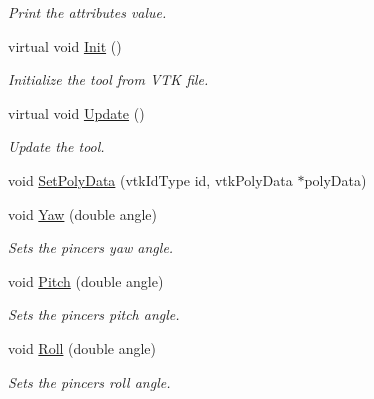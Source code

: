 \begin{DoxyCompactItemize}
\begin{DoxyCompactList}\small\item\em Print the attributes value. \item\end{DoxyCompactList}\item 
virtual void \hyperlink{classvtkToolDummy_aaf4c69a9c0fc3432e678ca9fffc913dc}{Init} ()
\begin{DoxyCompactList}\small\item\em Initialize the tool from VTK file. \item\end{DoxyCompactList}\item 
virtual void \hyperlink{classvtkToolDummy_a19cda726ffda0a3955e519d7b42e4882}{Update} ()
\begin{DoxyCompactList}\small\item\em Update the tool. \item\end{DoxyCompactList}\item 
void \hyperlink{classvtkToolDummy_a3170be76c18a7507cb6014fc49123919}{SetPolyData} (vtkIdType id, vtkPolyData $\ast$polyData)
\item 
\hypertarget{classvtkToolDummy_ae5dce01d7d7cf21ca321d0899531cc1c}{
void \hyperlink{classvtkToolDummy_ae5dce01d7d7cf21ca321d0899531cc1c}{Yaw} (double angle)}
\label{classvtkToolDummy_ae5dce01d7d7cf21ca321d0899531cc1c}

\begin{DoxyCompactList}\small\item\em Sets the pincers yaw angle. \item\end{DoxyCompactList}\item 
\hypertarget{classvtkToolDummy_a5ea0a677fb4cae300394b118197f2c8b}{
void \hyperlink{classvtkToolDummy_a5ea0a677fb4cae300394b118197f2c8b}{Pitch} (double angle)}
\label{classvtkToolDummy_a5ea0a677fb4cae300394b118197f2c8b}

\begin{DoxyCompactList}\small\item\em Sets the pincers pitch angle. \item\end{DoxyCompactList}\item 
\hypertarget{classvtkToolDummy_af3e1893d057ad3db3775c4cffd6a8b18}{
void \hyperlink{classvtkToolDummy_af3e1893d057ad3db3775c4cffd6a8b18}{Roll} (double angle)}
\label{classvtkToolDummy_af3e1893d057ad3db3775c4cffd6a8b18}

\begin{DoxyCompactList}\small\item\em Sets the pincers roll angle. \item\end{DoxyCompactList}\end{DoxyCompactItemize}
